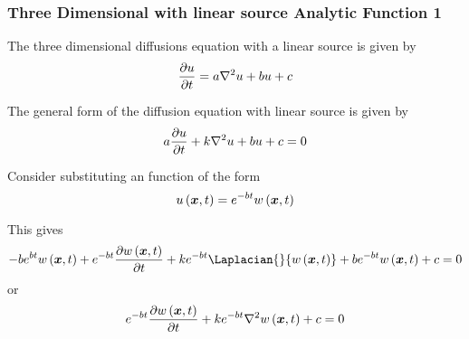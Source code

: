 \subsubsection{Three Dimensional with linear source Analytic Function 1}

The three dimensional diffusions equation with a linear source is given by
\begin{equation}
  \delby{u}{t}=a\laplacian{}{u}+bu+c
\end{equation}

The general form of the \OpenCMISS diffusion equation with linear source is
given by
\begin{equation}
  a\delby{u}{t}+k\laplacian{}{u}+bu+c=0
\end{equation}

Consider substituting an function of the form
\begin{equation}
   u\left( \boldsymbol{x},t \right) =e^{-bt} w\left( \boldsymbol{x},t \right) 
\end{equation}

This gives
\begin{equation}
  -be^{bt}\fnof{w}{\vectr{x},t}+e^{-bt}\delby{\fnof{w}{\vectr{x},t}}{t}+ke^{-bt}\Laplacian{}{\fnof{w}{\vectr{x},t}}+be^{-bt}\fnof{w}{\vectr{x},t}+c=0
\end{equation}
or
\begin{equation}
  e^{-bt}\delby{\fnof{w}{\vectr{x},t}}{t}+ke^{-bt}\laplacian{}{\fnof{w}{\vectr{x},t}}+c=0
\end{equation}
  
